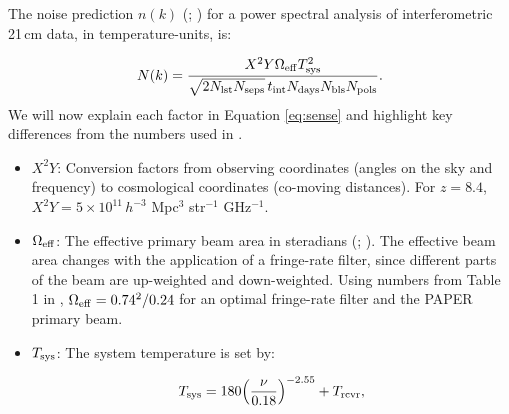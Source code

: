 \documentclass[preprint2,numberedappendix,tighten]{aastex6}  %
\begin{document}
The noise prediction $n(k)$ (\citealt{parsons_et_al2012a}; \citealt{pober_et_al2013}) for a power spectral analysis of 
interferometric 21\,cm data, in temperature-units, is:

\begin{equation}
\label{eq:sense}
N(k) = \frac{X^{2}Y \Omega_{\rm eff} T_{\rm sys}^{2}}{\sqrt{2N_{\rm lst}N_{\rm seps}}\,t_{\rm int}N_{\rm days}N_{\rm bls}N_{\rm pols}}.
\end{equation}
We will now explain each factor in Equation \eqref{eq:sense} and highlight key differences from the numbers used in .

\begin{itemize}
\item $X^{2}Y$: Conversion factors from observing coordinates (angles on the sky and frequency) to cosmological coordinates (co-moving 
distances). For $z=8.4$, $X^{2}Y = 5 \times 10^{11} \, h^{-3}$ Mpc$^{3}$ str$^{-1}$ GHz$^{-1}$.
\item $\Omega_{\rm eff}$: The effective primary beam area in steradians (\citealt{parsons_et_al2010}; \citealt{pober_et_al2012}). 
The effective beam area changes with the application of a fringe-rate filter, since different parts of the beam are up-weighted and down-weighted. Using numbers from Table 1 in \citet{parsons_et_al2016}, $\Omega_{\rm eff} = 0.74^{2}/0.24$ for an optimal fringe-rate 
filter and the PAPER primary beam. 
\item $T_{\rm sys}$: The system temperature is set by:

\begin{equation}
\label{eq:sys}
T_{\rm sys} = 180\Big(\frac{\nu}{0.18}\Big)^{-2.55} + T_{\rm rcvr},
\end{equation}


\end{itemize}
\end{document}
